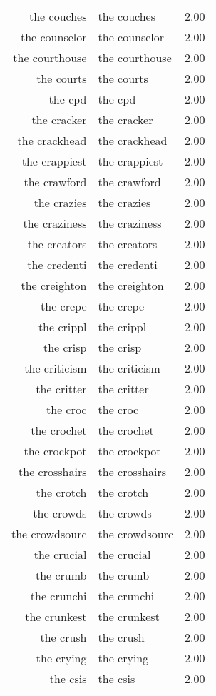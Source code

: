 \begin{table}[ht]
\begin{tabular}{rlr}
  the couches & the couches & 2.00 \\ 
  the counselor & the counselor & 2.00 \\ 
  the courthouse & the courthouse & 2.00 \\ 
  the courts & the courts & 2.00 \\ 
  the cpd & the cpd & 2.00 \\ 
  the cracker & the cracker & 2.00 \\ 
  the crackhead & the crackhead & 2.00 \\ 
  the crappiest & the crappiest & 2.00 \\ 
  the crawford & the crawford & 2.00 \\ 
  the crazies & the crazies & 2.00 \\ 
  the craziness & the craziness & 2.00 \\ 
  the creators & the creators & 2.00 \\ 
  the credenti & the credenti & 2.00 \\ 
  the creighton & the creighton & 2.00 \\ 
  the crepe & the crepe & 2.00 \\ 
  the crippl & the crippl & 2.00 \\ 
  the crisp & the crisp & 2.00 \\ 
  the criticism & the criticism & 2.00 \\ 
  the critter & the critter & 2.00 \\ 
  the croc & the croc & 2.00 \\ 
  the crochet & the crochet & 2.00 \\ 
  the crockpot & the crockpot & 2.00 \\ 
  the crosshairs & the crosshairs & 2.00 \\ 
  the crotch & the crotch & 2.00 \\ 
  the crowds & the crowds & 2.00 \\ 
  the crowdsourc & the crowdsourc & 2.00 \\ 
  the crucial & the crucial & 2.00 \\ 
  the crumb & the crumb & 2.00 \\ 
  the crunchi & the crunchi & 2.00 \\ 
  the crunkest & the crunkest & 2.00 \\ 
  the crush & the crush & 2.00 \\ 
  the crying & the crying & 2.00 \\ 
  the csis & the csis & 2.00 \\ 

\end{tabular}
\end{table}
